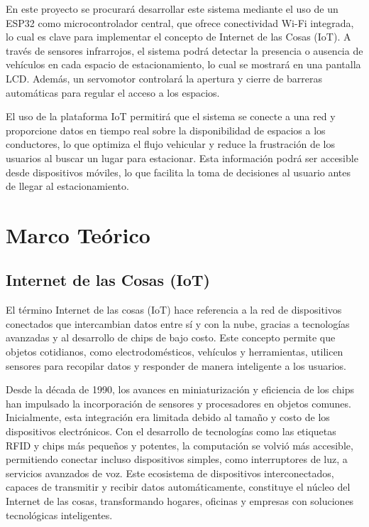 \documentclass[12pt,a4paper]{article}
\begin{document}
En este proyecto se procurará desarrollar este sistema mediante el uso de un ESP32 como microcontrolador central, que ofrece conectividad Wi-Fi integrada, lo cual es clave para implementar el concepto de Internet de las Cosas (IoT). A través de sensores infrarrojos, el sistema podrá detectar la presencia o ausencia de vehículos en cada espacio de estacionamiento, lo cual se mostrará en una pantalla LCD. Además, un servomotor controlará la apertura y cierre de barreras automáticas para regular el acceso a los espacios.

El uso de la plataforma IoT permitirá que el sistema se conecte a una red y proporcione datos en tiempo real sobre la disponibilidad de espacios a los conductores, lo que optimiza el flujo vehicular y reduce la frustración de los usuarios al buscar un lugar para estacionar. Esta información podrá ser accesible desde dispositivos móviles, lo que facilita la toma de decisiones al usuario antes de llegar al estacionamiento.

\section{Marco Teórico}

\subsection{Internet de las Cosas (IoT)}
El término Internet de las cosas (IoT) hace referencia a la red de dispositivos conectados que intercambian datos entre sí y con la nube, gracias a tecnologías avanzadas y al desarrollo de chips de bajo costo. Este concepto permite que objetos cotidianos, como electrodomésticos, vehículos y herramientas, utilicen sensores para recopilar datos y responder de manera inteligente a los usuarios. \cite{iot}

Desde la década de 1990, los avances en miniaturización y eficiencia de los chips han impulsado la incorporación de sensores y procesadores en objetos comunes. Inicialmente, esta integración era limitada debido al tamaño y costo de los dispositivos electrónicos. Con el desarrollo de tecnologías como las etiquetas RFID y chips más pequeños y potentes, la computación se volvió más accesible, permitiendo conectar incluso dispositivos simples, como interruptores de luz, a servicios avanzados de voz. Este ecosistema de dispositivos interconectados, capaces de transmitir y recibir datos automáticamente, constituye el núcleo del Internet de las cosas, transformando hogares, oficinas y empresas con soluciones tecnológicas inteligentes.\cite{iot}
\end{document}
